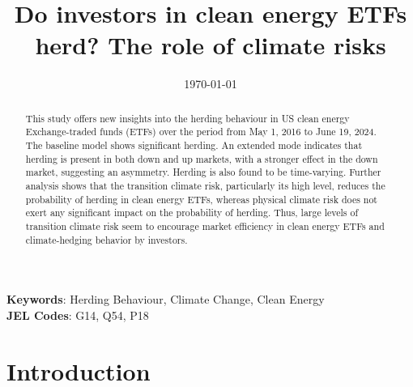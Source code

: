 \documentclass[
  letterpaper,
  DIV=11,
  numbers=noendperiod]{scrartcl}
\author{}
\date{}
\begin{document}
\title{Do investors in clean energy ETFs herd? The role of climate risks}



\date{\today}
\maketitle

\begin{abstract}

This study offers new insights into the herding behaviour in US clean energy Exchange-traded funds (ETFs) over the period from May 1, 2016 to June 19, 2024. 
The baseline model shows significant herding. An extended mode indicates that herding is present in both down and up markets, with a stronger effect in the down market, suggesting an asymmetry. 
Herding is also found to be time-varying. Further analysis shows that the transition climate risk, particularly its high level, reduces the probability of herding in clean energy ETFs, whereas physical climate risk does not exert any significant impact on the probability of herding. 
Thus, large levels of transition climate risk seem to encourage market efficiency in clean energy ETFs  and climate-hedging behavior by investors.

\end{abstract}

\noindent\textbf{Keywords}: Herding Behaviour, Climate Change, Clean Energy
\\
\textbf{JEL Codes}: G14, Q54, P18
\newpage


\section{Introduction}\label{introduction}
\end{document}
